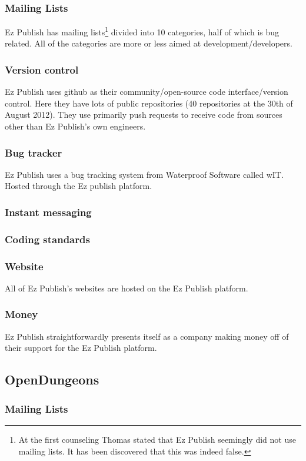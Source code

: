 \documentclass{report} %
\begin{document}
\subsubsection{Mailing Lists}
Ez Publish has mailing lists\cite{ezpubwebmaillists}\footnote{At the first counseling Thomas stated that Ez Publish seemingly did not use mailing lists. It has been discovered that this was indeed false.} divided into 10 categories, half of which is bug related. All of the categories are more or less aimed at development/developers.
\subsubsection{Version control}
Ez Publish uses github\cite{ezpubgithub} as their community/open-source code interface/version control. Here they have lots of public repositories (40 repositories at the 30th of August 2012). They use primarily push requests to receive code from sources other than Ez Publish's own engineers. %
\subsubsection{Bug tracker}
Ez Publish uses a bug tracking system from Waterproof Software\cite{waterproofweb} called wIT\cite{waterproofwebwit}. Hosted through the Ez publish platform.
\subsubsection{Instant messaging} %
\subsubsection{Coding standards}
\subsubsection{Website}
All of Ez Publish's websites are hosted on the Ez Publish platform.
\subsubsection{Money}
Ez Publish straightforwardly presents itself as a company making money off of their support for the Ez Publish platform.

\subsection{OpenDungeons}
\subsubsection{Mailing Lists}
\end{document}
